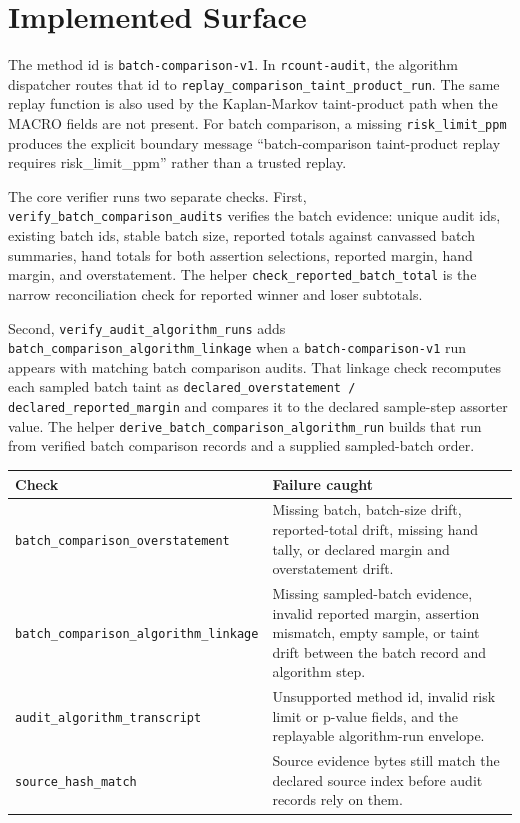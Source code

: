 \section{Implemented Surface}

The method id is \texttt{batch-comparison-v1}. In \texttt{rcount-audit}, the
algorithm dispatcher routes that id to
\texttt{replay\_comparison\_taint\_product\_run}. The same replay function is
also used by the Kaplan-Markov taint-product path when the MACRO fields are not
present. For batch comparison, a missing \texttt{risk\_limit\_ppm} produces the
explicit boundary message ``batch-comparison taint-product replay requires
risk\_limit\_ppm'' rather than a trusted replay.

The core verifier runs two separate checks. First,
\texttt{verify\_batch\_comparison\_audits} verifies the batch evidence:
unique audit ids, existing batch ids, stable batch size, reported totals against
canvassed batch summaries, hand totals for both assertion selections, reported
margin, hand margin, and overstatement. The helper
\texttt{check\_reported\_batch\_total} is the narrow reconciliation check for
reported winner and loser subtotals.

Second, \texttt{verify\_audit\_algorithm\_runs} adds
\texttt{batch\_comparison\_algorithm\_linkage} when a
\texttt{batch-comparison-v1} run appears with matching batch comparison audits.
That linkage check recomputes each sampled batch taint as
\texttt{declared\_overstatement / declared\_reported\_margin} and compares it
to the declared sample-step assorter value. The helper
\texttt{derive\_batch\_comparison\_algorithm\_run} builds that run from verified
batch comparison records and a supplied sampled-batch order.

\begin{center}
\small
\begin{tabularx}{\textwidth}{lX}
\toprule
Check & Failure caught \\
\midrule
\texttt{batch\_comparison\_overstatement} & Missing batch, batch-size drift, reported-total drift, missing hand tally, or declared margin and overstatement drift. \\
\texttt{batch\_comparison\_algorithm\_linkage} & Missing sampled-batch evidence, invalid reported margin, assertion mismatch, empty sample, or taint drift between the batch record and algorithm step. \\
\texttt{audit\_algorithm\_transcript} & Unsupported method id, invalid risk limit or p-value fields, and the replayable algorithm-run envelope. \\
\texttt{source\_hash\_match} & Source evidence bytes still match the declared source index before audit records rely on them. \\
\bottomrule
\end{tabularx}
\end{center}
